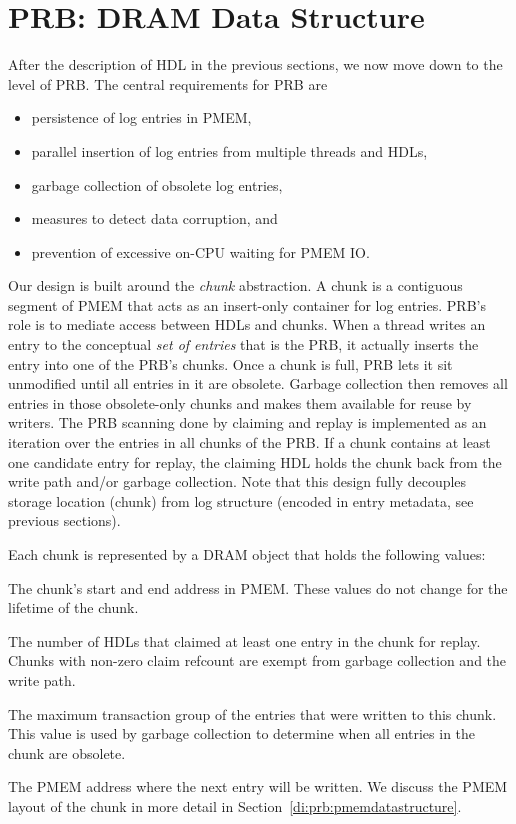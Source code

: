 \documentclass[12pt,a4paper,twoside]{book}
\begin{document}
{\section{PRB: DRAM Data Structure}\label{di:prb:dramdatastructure}
After the description of HDL in the previous sections, we now move down to the level of PRB.
The central requirements for PRB are
\begin{itemize}[noitemsep]
    \item persistence of log entries in PMEM,
    \item parallel insertion of log entries from multiple threads and HDLs,
    \item garbage collection of obsolete log entries,
    \item measures to detect data corruption, and
    \item prevention of excessive on-CPU waiting for PMEM IO.
\end{itemize}

Our design is built around the \textit{chunk} abstraction.
A chunk is a contiguous segment of PMEM that acts as an insert-only container for log entries.
PRB's role is to mediate access between HDLs and chunks.
When a thread writes an entry to the conceptual \textit{set of entries} that is the PRB, it actually inserts the entry into one of the PRB's chunks.
Once a chunk is full, PRB lets it sit unmodified until all entries in it are obsolete.
Garbage collection then removes all entries in those obsolete-only chunks and makes them available for reuse by writers.
The PRB scanning done by claiming and replay is implemented as an iteration over the entries in all chunks of the PRB.
If a chunk contains at least one candidate entry for replay, the claiming HDL holds the chunk back from the write path and/or garbage collection.
Note that this design fully decouples storage location (chunk) from log structure (encoded in entry metadata, see previous sections).

Each chunk is represented by a DRAM object that holds the following values:
\begin{description}[noitemsep]
    \item[PMEM location] The chunk's start and end address in PMEM. These values do not change for the lifetime of the chunk.
    \item[Claim refcount] The number of HDLs that claimed at least one entry in the chunk for replay.
        Chunks with non-zero claim refcount are exempt from garbage collection and the write path.
    \item[Max txg] The maximum transaction group of the entries that were written to this chunk.
        This value is used by garbage collection to determine when all entries in the chunk are obsolete.
    \item[Write position] The PMEM address where the next entry will be written.
        We discuss the PMEM layout of the chunk in more detail in Section~\ref{di:prb:pmemdatastructure}.
\end{description}

}
\end{document}
